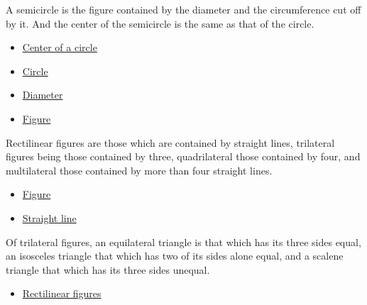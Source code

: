 \begin{definition}[Semicircle]
\label{def:euclid-semicircle}
A semicircle is the figure contained by the diameter and the circumference cut
off by it. And the center of the semicircle is the same as that of the circle.
\end{definition}
\begin{lra-not-visible}
\begin{dependencies}
\begin{itemize}
  \item \hyperref[def:euclid-center-of-a-circle]{Center of a circle}
  \item \hyperref[def:euclid-circle]{Circle}
  \item \hyperref[def:euclid-diameter]{Diameter}
  \item \hyperref[def:euclid-figure]{Figure}
\end{itemize}
\end{dependencies}
\end{lra-not-visible}

\begin{definition}
\label{def:euclid-rectilinear-figures}
Rectilinear figures are those which are contained by straight lines, trilateral
figures being those contained by three, quadrilateral those contained by four,
and multilateral those contained by more than four straight lines.
\end{definition}
\begin{lra-not-visible}
\begin{dependencies}
\begin{itemize}
  \item \hyperref[def:euclid-figure]{Figure}
  \item \hyperref[def:euclid-straight-line]{Straight line}
\end{itemize}
\end{dependencies}
\end{lra-not-visible}

\begin{definition}
\label{def:euclid-triangle-side-classes}
Of trilateral figures, an equilateral triangle is that which has its three
sides equal, an isosceles triangle that which has two of its sides alone equal,
and a scalene triangle that which has its three sides unequal.
\end{definition}
\begin{lra-not-visible}
\begin{dependencies}
\begin{itemize}
  \item \hyperref[def:euclid-rectilinear-figures]{Rectilinear figures}
\end{itemize}
\end{dependencies}
\end{lra-not-visible}

